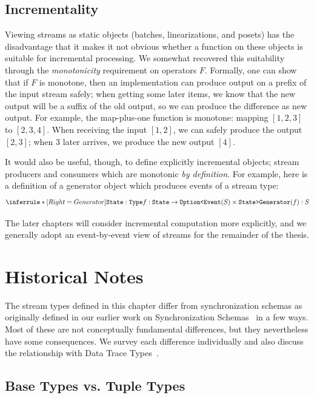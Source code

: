 \subsection{Incrementality}
\label{sec:incrementality-discussion}

Viewing streams as static objects (batches, linearizations, and posets)
has the disadvantage that it makes it not obvious whether a function on these objects is suitable for incremental processing.
We somewhat recovered this suitability through the \emph{monotonicity} requirement on operators $F$.
Formally, one can show that if $F$ is monotone, then an implementation can
produce output on a prefix of the input stream safely; when getting some later items, we know that the new output will be a suffix of the old output, so we can produce the difference as new output. For example, the map-plus-one function is monotone: mapping $[1, 2, 3]$ to $[2, 3, 4]$. When receiving the input $[1, 2]$, we can safely produce the output $[2, 3]$; when $3$ later arrives, we produce the new output $[4]$.

It would also be useful, though, to define explicitly incremental objects; stream producers and consumers which are monotonic \emph{by definition}.
For example, here is a definition of a generator object which produces events of a stream type:
\[
\inference[Generator]
{
  \texttt{State}: \texttt{Type} \\
  f: \texttt{State} \to \texttt{Option<}\texttt{Event}(S) \times \texttt{State>}
}
{
  \texttt{Generator}(f): S
}
\]

The later chapters will consider incremental computation more explicitly, and we generally adopt an event-by-event view of streams for the remainder of the thesis.

\section{Historical Notes}
\label{sec:historical}

The stream types defined in this chapter differ from synchronization schemas as originally defined in our earlier work on Synchronization Schemas~
in a few ways. Most of these are not conceptually fundamental differences, but they nevertheless have some consequences. We survey each difference individually and also discuss the relationship with Data Trace Types~.

\subsection{Base Types vs. Tuple Types}


